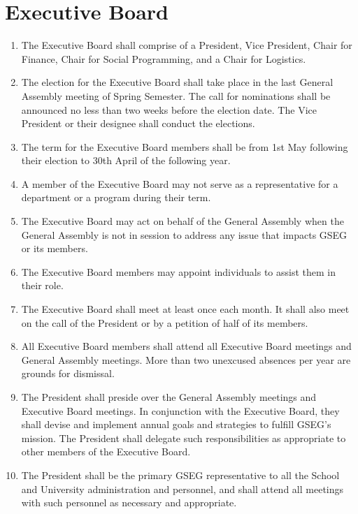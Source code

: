 \chapter{Executive Board}
\label{art:exec}

\begin{enumerate}[label=\Alph*.]

\item The Executive Board shall comprise of a President, Vice President, Chair for Finance, 
Chair for Social Programming, and a Chair for Logistics.
\item The election for the Executive Board shall take place in the last General Assembly meeting of Spring Semester. The call for nominations shall be announced no less than two weeks before the
election date. The Vice President or their designee shall conduct the elections.
\item The term for the Executive Board members shall be from 1st May following their election to
30th April of the following year.  
\item A member of the Executive Board may not serve as a representative for a department or a
program during their term.
\item The Executive Board may act on behalf of the General Assembly when the General Assembly is
not in session to address any issue that impacts GSEG or its members.
\item The Executive Board members may appoint individuals to assist them in their role.

\item The Executive Board shall meet at least once each month. It shall also meet on the call
of the President or by a petition of half of its members. 

\item All Executive Board members shall attend all Executive Board meetings and General Assembly
meetings. More than two unexcused absences per year are grounds for dismissal.

\item The President shall preside over the General Assembly meetings and Executive Board meetings. In conjunction with the Executive Board, they shall devise and implement annual goals and strategies to fulfill GSEG's mission. The President shall delegate such responsibilities as appropriate to other members of the Executive Board. 

\item The President shall be the primary GSEG representative to all the School and University administration and personnel, and shall attend all meetings with such personnel as necessary and appropriate.


\end{enumerate}
